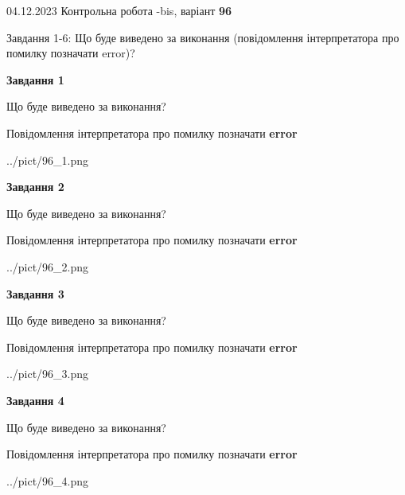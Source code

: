 \documentclass[12pt, ukrainian]{article}
\begin{document}
{{04.12.2023 Контрольна робота -bis, варіант  \No \textbf { 96 }\par}}
{

Завдання 1-6: Що буде виведено за виконання (повідомлення інтерпретатора про помилку позначати error)?


{\begin {center}\textbf{Завдання 1}\end {center}}\par
Що буде виведено за виконання? \par
Повідомлення інтерпретатора про помилку позначати \textbf{error}

\begin{center}
	{../pict/96_1.png}
\end{center}
\newpage

{\begin {center}\textbf{Завдання 2}\end {center}}\par
Що буде виведено за виконання? \par
Повідомлення інтерпретатора про помилку позначати \textbf{error}

\begin{center}
	{../pict/96_2.png}
\end{center}
\newpage

{\begin {center}\textbf{Завдання 3}\end {center}}\par
Що буде виведено за виконання? \par
Повідомлення інтерпретатора про помилку позначати \textbf{error}

\begin{center}
	{../pict/96_3.png}
\end{center}
\newpage

{\begin {center}\textbf{Завдання 4}\end {center}}\par
Що буде виведено за виконання? \par
Повідомлення інтерпретатора про помилку позначати \textbf{error}

\begin{center}
	{../pict/96_4.png}
\end{center}
\newpage

}
\end{document}
